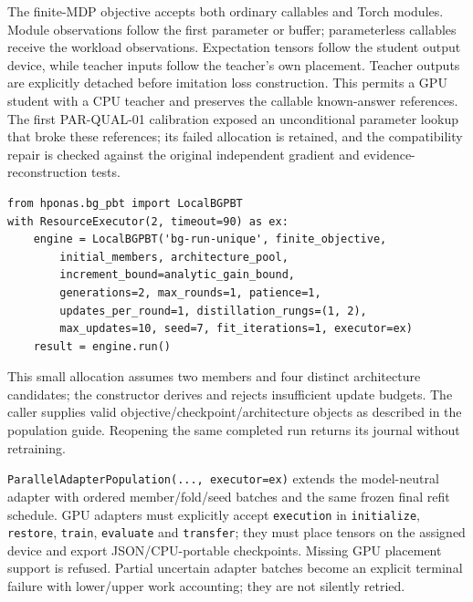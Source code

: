 The finite-MDP objective accepts both ordinary callables and Torch modules.
Module observations follow the first parameter or buffer; parameterless
callables receive the workload observations. Expectation tensors follow the
student output device, while teacher inputs follow the teacher's own placement.
Teacher outputs are explicitly detached before imitation loss construction.
This permits a GPU student with a CPU teacher and preserves the callable
known-answer references. The first PAR-QUAL-01 calibration exposed an
unconditional parameter lookup that broke these references; its failed
allocation is retained, and the compatibility repair is checked against the
original independent gradient and evidence-reconstruction tests.

\begin{Verbatim}[fontsize=\small]
from hponas.bg_pbt import LocalBGPBT
with ResourceExecutor(2, timeout=90) as ex:
    engine = LocalBGPBT('bg-run-unique', finite_objective,
        initial_members, architecture_pool,
        increment_bound=analytic_gain_bound,
        generations=2, max_rounds=1, patience=1,
        updates_per_round=1, distillation_rungs=(1, 2),
        max_updates=10, seed=7, fit_iterations=1, executor=ex)
    result = engine.run()
\end{Verbatim}
This small allocation assumes two members and four distinct architecture
candidates; the constructor derives and rejects insufficient update budgets.
The caller supplies valid objective/checkpoint/architecture objects as described
in the population guide. Reopening the same completed run returns its journal
without retraining.

\texttt{ParallelAdapterPopulation(..., executor=ex)} extends the model-neutral
adapter with ordered member/fold/seed batches and the same frozen final refit
schedule. GPU adapters must explicitly accept \texttt{execution} in
\texttt{initialize}, \texttt{restore}, \texttt{train}, \texttt{evaluate} and
\texttt{transfer}; they must place tensors on the assigned device and export
JSON/CPU-portable checkpoints. Missing GPU placement support is refused.
Partial uncertain adapter batches become an explicit terminal failure with
lower/upper work accounting; they are not silently retried.

